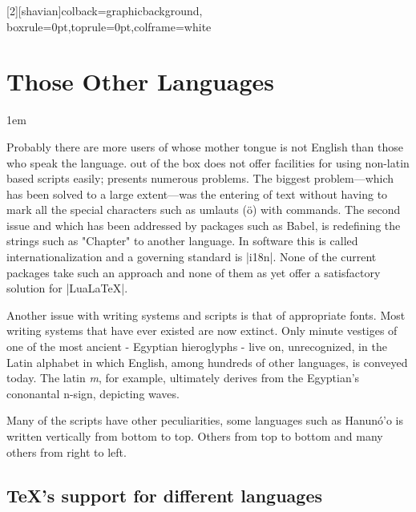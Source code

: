 [2][shavian]{colback=graphicbackground,
boxrule=0pt,toprule=0pt,colframe=white}


\chapter{Those Other Languages}
\minitoc
\parindent1em

\pagestyle{myheadings}

Probably there are more users of \latexe whose mother tongue is not English than those who speak the language. \tex out of the box does not offer facilities for using non-latin based scripts easily; presents numerous problems. The biggest problem---which has been solved to a large extent---was the entering of text without having to mark all the special
characters such as umlauts (\"o) with commands. The second issue and which has been addressed by packages such as Babel, is redefining the strings such as "Chapter" to another language. In software this is called internationalization and a governing standard is |i18n|. None of the current packages take such an approach and none of them as yet offer a satisfactory solution for |LuaLaTeX|. 

Another issue with writing systems and scripts is that of appropriate fonts. Most writing systems that have ever existed are now extinct. Only minute vestiges of one of the most ancient - Egyptian hieroglyphs - live on, unrecognized, in the Latin alphabet in which English, among hundreds of other languages, is conveyed today. The latin \textit{m}, for example, ultimately derives from the Egyptian's cononantal n-sign, depicting waves.

Many of the scripts have other peculiarities, some languages such as Hanunó'o is written vertically from bottom to top. Others from top to bottom and many others from right to left. 

\section{TeX's support for different languages}

